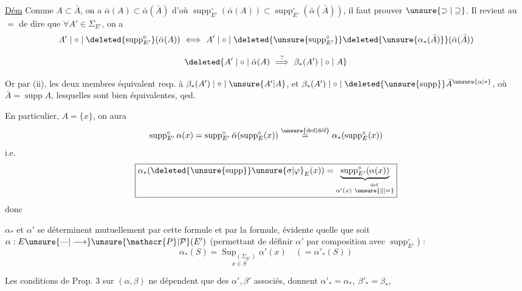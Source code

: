 \uline{Dém} Comme $A\subset\bar A$, on a $\bar\alpha(A)\subset\bar\alpha(\bar A)$ d'où $\operatorname{supp}^{\circ}_{E'}(\bar\alpha(A))\subset\operatorname{supp}^{\circ}_{E'}(\bar\alpha(\bar A))$, il faut prouver $\unsure{\supset|\supseteq}$. Il revient au $=$ de dire que $\forall A'\in\Sigma_{E'}$, on a
\[
A'\mid\circ\mid\deleted{\operatorname{supp}^{\circ}_{E'}}(\bar\alpha(A))\ \Longleftrightarrow\ A'\mid\circ\mid\deleted{\unsure{\operatorname{supp}^{\circ}_{E'}}}\deleted{\unsure{\alpha_*(\bar A)}}(\bar\alpha(\bar A))
\]


\[
\deleted{A'\mid\circ\mid\bar\alpha(A)\ \overset{?}{\Longrightarrow}\ \beta_*(A')\mid\circ\mid A}
\]

Or par (ii), les deux membres équivalent resp. à $\beta_*(A')\mid\circ\mid\unsure{A'|A}$, et $\beta_*(A')\mid\circ\mid\deleted{\unsure{\operatorname{supp}}}\bar A^{\unsure{\alpha|*}}$, où $\bar A=\operatorname{supp}A$, lesquelles sont bien équivalentes, qed.

En particulier,  $A=\{x\}$, on aura
\[
\operatorname{supp}^{\circ}_{E'}\alpha(x)=\operatorname{supp}^{\circ}_{E'}\bar\alpha(\operatorname{supp}^{\circ}_E(x))\overset{\text{\unsure{def|déf}}}=\alpha_*(\operatorname{supp}^{\circ}_E(x))
\]
i.e.
\[
\boxed{\alpha_*(\deleted{\unsure{\operatorname{supp}}}\unsure{\sigma|\varphi}_E(x))=\underbrace{\operatorname{supp}^{\circ}_{E'}(\alpha(x))}_{\alpha'(x)\ \overset{\text{def}}{\unsure{\Vert|=}}}}
\]
donc 

$\alpha_*$ et $\alpha'$ se déterminent mutuellement par cette formule et par la formule, évidente quelle que soit $\alpha:E\unsure{\text{---}|\longrightarrow}\unsure{\mathscr{P}|\mathcal{P}}(E')$ (permettant \inserted{$\unsure{\alpha_*|\alpha}$} de définir $\alpha'$ par composition avec $\operatorname{supp}^{\circ}_{E'}$) :
\[
\boxed{\alpha_*(S)=\underset{x\in S}{\operatorname{Sup}_{(\Sigma_{E'})}}\alpha'(x)}\quad(=\alpha'_*(S))
\]

Les conditions de Prop. 3 sur $(\alpha,\beta)$ ne dépendent que des $\alpha',\beta'$ associés,   donnent $\alpha'_* =\alpha_*,\ \beta'_* =\beta_*$,

